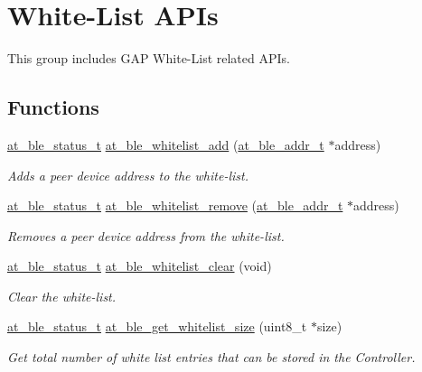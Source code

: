 \hypertarget{group__gap__whitelist__group}{}\section{White-\/\+List A\+P\+Is}
\label{group__gap__whitelist__group}


This group includes G\+AP White-\/\+List related A\+P\+Is.  


\subsection*{Functions}
\begin{DoxyCompactItemize}
\item 
\mbox{\hyperlink{group__error__codes__group_ga3b1db9b95feb157b3c188ca27fe76988}{at\+\_\+ble\+\_\+status\+\_\+t}} \mbox{\hyperlink{group__gap__whitelist__group_ga9c03fafebf456d7cdc4c0f66e87a2847}{at\+\_\+ble\+\_\+whitelist\+\_\+add}} (\mbox{\hyperlink{structat__ble__addr__t}{at\+\_\+ble\+\_\+addr\+\_\+t}} $\ast$address)
\begin{DoxyCompactList}\small\item\em Adds a peer device address to the white-\/list. \end{DoxyCompactList}\item 
\mbox{\hyperlink{group__error__codes__group_ga3b1db9b95feb157b3c188ca27fe76988}{at\+\_\+ble\+\_\+status\+\_\+t}} \mbox{\hyperlink{group__gap__whitelist__group_ga4ca7d64ac40fa8d67b3f7a39058b6b4e}{at\+\_\+ble\+\_\+whitelist\+\_\+remove}} (\mbox{\hyperlink{structat__ble__addr__t}{at\+\_\+ble\+\_\+addr\+\_\+t}} $\ast$address)
\begin{DoxyCompactList}\small\item\em Removes a peer device address from the white-\/list. \end{DoxyCompactList}\item 
\mbox{\hyperlink{group__error__codes__group_ga3b1db9b95feb157b3c188ca27fe76988}{at\+\_\+ble\+\_\+status\+\_\+t}} \mbox{\hyperlink{group__gap__whitelist__group_gae25e4c2f9252f3080b2a784c84159564}{at\+\_\+ble\+\_\+whitelist\+\_\+clear}} (void)
\begin{DoxyCompactList}\small\item\em Clear the white-\/list. \end{DoxyCompactList}\item 
\mbox{\hyperlink{group__error__codes__group_ga3b1db9b95feb157b3c188ca27fe76988}{at\+\_\+ble\+\_\+status\+\_\+t}} \mbox{\hyperlink{group__gap__whitelist__group_ga42b6dd0c5c1d8e69b0e1d76173f6cb98}{at\+\_\+ble\+\_\+get\+\_\+whitelist\+\_\+size}} (uint8\+\_\+t $\ast$size)
\begin{DoxyCompactList}\small\item\em Get total number of white list entries that can be stored in the Controller. \end{DoxyCompactList}\end{DoxyCompactItemize}


